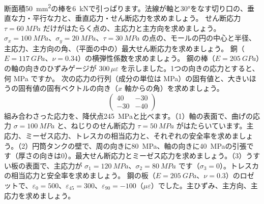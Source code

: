 \bkendproblems
{}
\bkproblem 断面積\qty{50}{mm^2}の棒を\qty{6}{kN}で引っぱります。法線が軸と30°をなす切り口の、垂直な力・平行な力と、垂直応力・せん断応力を求めましょう。
\bkproblem せん断応力 $\tau=\qty{60}{MPa}$ だけがはたらく点の、主応力と主方向を求めましょう。
\bkproblem $\sigma_x=\qty{100}{MPa}$、$\sigma_y=\qty{20}{MPa}$、$\tau=\qty{30}{MPa}$ の点の、モールの円の中心と半径、主応力、主方向の角、（平面の中の）最大せん断応力を求めましょう。
\bkproblem 銅（$E=\qty{117}{GPa}$、$\nu=0.34$）の横弾性係数を求めましょう。
\bkproblem 鋼の棒（$E=\qty{205}{GPa}$）の軸の向きのひずみゲージが $300\,\mu\varepsilon$ を示しました。1つの向きの応力とすると、何 MPa ですか。
\bkproblem 次の応力の行列（成分の単位は MPa）の固有値と、大きいほうの固有値の固有ベクトルの向き（$x$ 軸からの角）を求めましょう。
\[\begin{pmatrix}40&-30\\-30&-40\end{pmatrix}\]
\bkproblem 組み合わさった応力を、降伏点\qty{245}{MPa}と比べます。（1）軸の表面で、曲げの応力 $\sigma=\qty{100}{MPa}$ と、ねじりのせん断応力 $\tau=\qty{50}{MPa}$ がはたらいています。主応力、ミーゼス応力、トレスカの相当応力と、それぞれの安全率を求めましょう。（2）円筒タンクの壁で、周の向きに\qty{80}{MPa}、軸の向きに\qty{40}{MPa}の引張です（厚さの向きは0）。最大せん断応力とミーゼス応力を求めましょう。（3）うすい板の表面で、主応力が $\sigma_1=\qty{120}{MPa}$、$\sigma_2=\qty{80}{MPa}$ です（$\sigma_3=0$）。トレスカの相当応力と安全率を求めましょう。
\bkproblem 鋼の板（$E=\qty{205}{GPa}$、$\nu=0.3$）のロゼットで、$\varepsilon_0=500$、$\varepsilon_{45}=300$、$\varepsilon_{90}=-100$（$\mu\varepsilon$）でした。主ひずみ、主方向、主応力を求めましょう。
